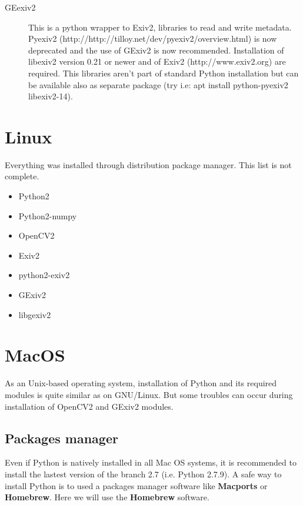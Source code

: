 \documentclass[a4paper, 11pt]{article}
\begin{document}
\begin{description}
\begin{description}
\begin{description}
\item [GEexiv2] This is a python wrapper to Exiv2, libraries to read and write metadata. Pyexiv2 (http://http://tilloy.net/dev/pyexiv2/overview.html) is now deprecated and the use of GExiv2 is now recommended. Installation of libexiv2 version 0.21 or newer and of Exiv2 (http://www.exiv2.org) are required. This libraries aren't part of standard Python installation but can be available also as separate package (try i.e: apt install python-pyexiv2 libexiv2-14). 


\end{description}
\end{description}

\section{Linux}
Everything was installed through distribution package manager. This list is not complete.

\begin{itemize}

\item Python2
\item Python2-numpy
\item OpenCV2
\item Exiv2
\item python2-exiv2
\item GExiv2
\item libgexiv2

\end{itemize}

\section{MacOS}

As an Unix-based operating system, installation of Python and its required modules is quite similar as on GNU/Linux. But some troubles can occur during installation of OpenCV2 and GExiv2 modules.

\subsection*{Packages manager}

Even if Python is natively installed in all Mac OS systems, it is recommended to install the lastest version of the branch 2.7 (i.e. Python 2.7.9). A safe way to install Python is to used a packages manager software like \textbf{Macports} or \textbf{Homebrew}. Here we will use the \textbf{Homebrew} software.


\end{description}
\end{document}
